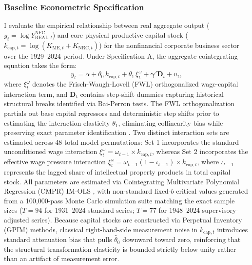 \subsubsection{Baseline Econometric Specification}
I evaluate the empirical relationship between real aggregate output ($y_t = \log Y_{\text{REAL},t}^{\text{NFC}}$) and core physical productive capital stock ($k_{\text{cap},t} = \log(K_{\text{ME},t} + K_{\text{NRC},t})$) for the nonfinancial corporate business sector over the 1929--2024 period. Under Specification A, the aggregate cointegrating equation takes the form:
\begin{equation}
	y_t = \alpha + \theta_0\, k_{\text{cap},t} + \theta_1\, \xi^{\omega}_t + \boldsymbol{\gamma}' \mathbf{D}_t + u_t,
	\label{eq:431:specA_model}
\end{equation}
where $\xi^{\omega}_t$ denotes the Frisch-Waugh-Lovell (FWL) orthogonalized wage-capital interaction term, and $\mathbf{D}_t$ contains step-shift dummies capturing historical structural breaks identified via Bai-Perron tests. The FWL orthogonalization partials out base capital regressors and deterministic step shifts prior to estimating the interaction elasticity $\theta_1$, eliminating collinearity bias while preserving exact parameter identification \citep{VogelsangWagner2024}. Two distinct interaction sets are estimated across 48 total model permutations: Set 1 incorporates the standard unconditioned wage interaction $\xi^{\omega}_t = \omega_{t-1} \times k_{\text{cap},t}$, whereas Set 2 incorporates the effective wage pressure interaction $\xi^{\omega}_t = \omega_{t-1}(1 - \iota_{t-1}) \times k_{\text{cap},t}$, where $\iota_{t-1}$ represents the lagged share of intellectual property products in total capital stock. All parameters are estimated via Cointegrating Multivariate Polynomial Regression (CMPR) IM-OLS \citep{VogelsangWagner2024}, with non-standard fixed-$b$ critical values generated from a 100,000-pass Monte Carlo simulation suite matching the exact sample sizes ($T = 94$ for 1931--2024 standard series; $T = 77$ for 1948--2024 supervisory-adjusted series). Because capital stocks are constructed via Perpetual Inventory (GPIM) methods, classical right-hand-side measurement noise in $k_{\text{cap},t}$ introduces standard attenuation bias that pulls $\hat{\theta}_0$ downward toward zero, reinforcing that the structural transformation elasticity is bounded strictly below unity rather than an artifact of measurement error.


